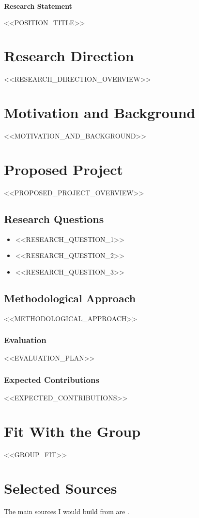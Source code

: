 \documentclass[11pt,a4paper]{article}
\newcommand{\statementtitle}[1]{%
  \begin{center}
    {\Large\bfseries #1}
  \end{center}
}
\newcommand{\statementsubtitle}[1]{%
  \begin{center}
    {\normalsize #1}
  \end{center}
  \vspace{0.5em}
}
\begin{document}
\statementtitle{Research Statement}
\statementsubtitle{<<POSITION\_TITLE>>}

\section{Research Direction}
<<RESEARCH\_DIRECTION\_OVERVIEW>>

\section{Motivation and Background}
<<MOTIVATION\_AND\_BACKGROUND>>

\section{Proposed Project}
<<PROPOSED\_PROJECT\_OVERVIEW>>

\subsection{Research Questions}
\begin{itemize}
    \item <<RESEARCH\_QUESTION\_1>>
    \item <<RESEARCH\_QUESTION\_2>>
    \item <<RESEARCH\_QUESTION\_3>>
\end{itemize}

\subsection{Methodological Approach}
<<METHODOLOGICAL\_APPROACH>>

\subsubsection{Evaluation}
<<EVALUATION\_PLAN>>

\subsubsection{Expected Contributions}
<<EXPECTED\_CONTRIBUTIONS>>

\section{Fit With the Group}
<<GROUP\_FIT>>

\section{Selected Sources}
The main sources I would build from are \cite{ref1,ref2,ref3}.
\end{document}
